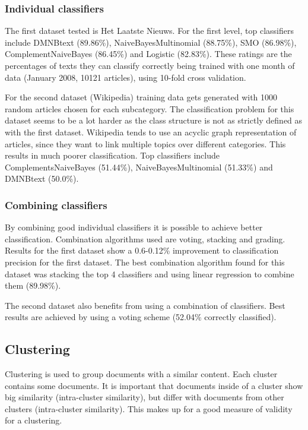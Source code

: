 \documentclass[twocolumn,twoside,a4paper]{phdsymp} %
\begin{document}
\subsubsection{Individual classifiers}
The first dataset tested is Het Laatste Nieuws. For the first level, top classifiers include DMNBtext (89.86\%), NaiveBayesMultinomial (88.75\%), SMO (86.98\%), ComplementNaiveBayes (86.45\%) and Logistic (82.83\%). These ratings are the percentages of texts they can classify correctly being trained with one month of data (January 2008, 10121 articles), using 10-fold cross validation. 

For the second dataset (Wikipedia) training data gets generated with 1000 random articles chosen for each subcategory. The classification problem for this dataset seems to be a lot harder as the class structure is not as strictly defined as with the first dataset. Wikipedia tends to use an acyclic graph representation of articles, since they want to link multiple topics over different categories. This results in much poorer classification. Top classifiers include ComplementsNaiveBayes (51.44\%), NaiveBayesMultinomial (51.33\%) and DMNBtext (50.0\%).

\subsubsection{Combining classifiers}
By combining good individual classifiers it is possible to achieve better classification. Combination algorithms used are voting, stacking and grading. Results for the first dataset show a 0.6-0.12\% improvement to classification precision for the first dataset. The best combination algorithm found for this dataset was stacking the top 4 classifiers and using linear regression to combine them (89.98\%).

The second dataset also benefits from using a combination of classifiers. Best results are achieved by using a voting scheme (52.04\% correctly classified).

\subsection{Clustering}
Clustering is used to group documents with a similar content. Each cluster contains some documents. It is important that documents inside of a cluster show big similarity (intra-cluster similarity), but differ with documents from other clusters (intra-cluster similarity). This makes up for a good measure of validity for a clustering. 
\end{document}
